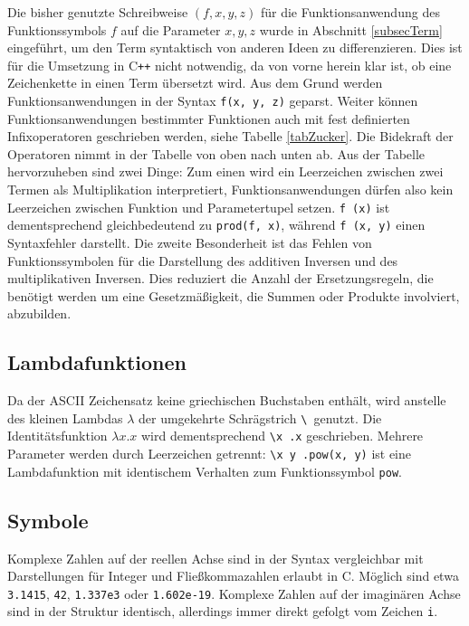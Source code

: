 Die bisher genutzte Schreibweise $(f, x, y, z)$ für die Funktionsanwendung des Funktionssymbols $f$ auf die Parameter $x, y, z$ wurde in Abschnitt \ref{subsecTerm} eingeführt, um den Term syntaktisch von anderen Ideen zu differenzieren. Dies ist für die Umsetzung in C\texttt{++} nicht notwendig, da von vorne herein klar ist, ob eine Zeichenkette in einen Term übersetzt wird. Aus dem Grund werden Funktionsanwendungen in der Syntax \verb|f(x, y, z)| geparst. 
Weiter können Funktionsanwendungen bestimmter Funktionen auch mit fest definierten Infixoperatoren geschrieben werden, siehe Tabelle \ref{tabZucker}. Die Bidekraft der Operatoren nimmt in der Tabelle von oben nach unten ab.
Aus der Tabelle hervorzuheben sind zwei Dinge: Zum einen wird ein Leerzeichen zwischen zwei Termen als Multiplikation interpretiert, Funktionsanwendungen dürfen also kein Leerzeichen zwischen Funktion und Parametertupel setzen. \verb|f (x)| ist dementsprechend gleichbedeutend zu \verb|prod(f, x)|, während \verb|f (x, y)| einen Syntaxfehler darstellt. Die zweite Besonderheit ist das Fehlen von Funktionssymbolen für die Darstellung des additiven Inversen und des multiplikativen Inversen. Dies reduziert die Anzahl der Ersetzungsregeln, die benötigt werden um eine Gesetzmäßigkeit, die Summen oder Produkte involviert, abzubilden. 

\subsection{Lambdafunktionen} \label{subsubsecLambdaSyntax}
Da der ASCII Zeichensatz keine griechischen Buchstaben enthält, wird anstelle des kleinen Lambdas $\lambda$ der umgekehrte Schrägstrich \verb~\ ~genutzt. Die Identitätsfunktion $\lambda x.x$ wird dementsprechend \verb~\x .x~ geschrieben. Mehrere Parameter werden durch Leerzeichen getrennt: \verb~\x y .pow(x, y)~ ist eine Lambdafunktion mit identischem Verhalten zum Funktionssymbol \verb|pow|.

\subsection{Symbole}
Komplexe Zahlen auf der reellen Achse sind in der Syntax vergleichbar mit Darstellungen für Integer und Fließkommazahlen erlaubt in C. Möglich sind etwa \verb|3.1415|, \verb|42|, \verb|1.337e3| oder \verb|1.602e-19|. Komplexe Zahlen auf der imaginären Achse sind in der Struktur identisch, allerdings immer direkt gefolgt vom Zeichen \verb|i|. 

